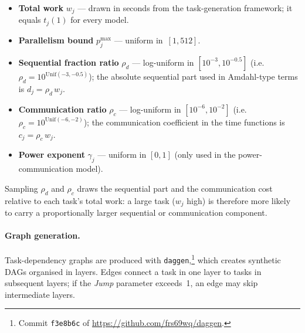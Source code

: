 \documentclass{article}
\begin{document}
\begin{itemize}
    \item \textbf{Total work} \(w_j\) — drawn in seconds from the
          task-generation framework; it equals \(t_j(1)\) for every model.
    \item \textbf{Parallelism bound} \(p_j^{\max}\) — uniform in $\,[1,512]$.
    \item \textbf{Sequential fraction ratio} $\rho_d$
          — log-uniform in $[10^{-3},10^{-0.5}]$
          (i.e.\ $\rho_d = 10^{\mathrm{Unif}(-3,-0.5)}$);  
          the absolute sequential part used in Amdahl-type terms is
          \(d_j = \rho_d \, w_j\).
    \item \textbf{Communication ratio} $\rho_c$
          — log-uniform in $[10^{-6},10^{-2}]$
          (i.e.\ $\rho_c = 10^{\mathrm{Unif}(-6,-2)}$);  
          the communication coefficient in the time functions is
          \(c_j = \rho_c \, w_j\).
    \item \textbf{Power exponent} $\gamma_j$ — uniform in $[0,1]$
          (only used in the power-communication model).
\end{itemize}

\noindent
Sampling $\rho_d$ and $\rho_c$ draws the
sequential part and the communication cost relative to each task’s
total work: a large task ($w_j$ high) is therefore more likely to carry a
proportionally larger sequential or communication component.



\paragraph{Graph generation.}
Task-dependency graphs are produced with \texttt{daggen},\footnote{Commit
\texttt{f3e8b6c} of
\url{https://github.com/frs69wq/daggen}.}
which creates synthetic DAGs organised in layers.
Edges connect a task in one layer to tasks in subsequent layers; if the
\textit{Jump} parameter exceeds~1, an edge may skip intermediate layers.
\end{document}
